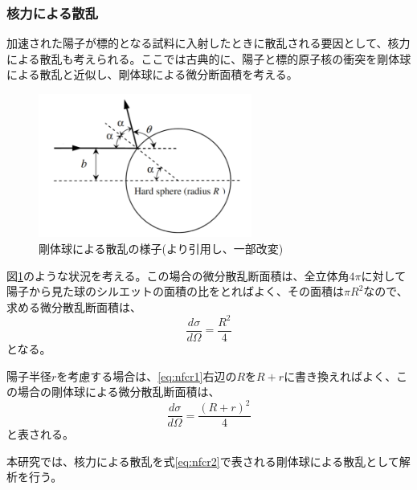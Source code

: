 \documentclass[a4paper,11pt,dvipdfmx]{jsarticle}
\begin{document}
\newpage
\subsubsection{核力による散乱}\label{NF}
加速された陽子が標的となる試料に入射したときに散乱される要因として、核力による散乱も考えられる。ここでは古典的に、陽子と標的原子核の衝突を剛体球による散乱と近似し、剛体球による微分断面積を考える。

\begin{figure}[htbp]
\centering
\includegraphics[width=7cm]{picture/cstheory/NF.png}
\caption{剛体球による散乱の様子(\cite{ion}より引用し、一部改変)}
\label{fig:NF}
\end{figure}

図\ref{fig:NF}のような状況を考える。この場合の微分散乱断面積は、全立体角$4\pi$に対して陽子から見た球のシルエットの面積の比をとればよく、その面積は$\pi R^{2}$なので、 \\
求める微分散乱断面積は、
\begin{equation}
    \frac{d\sigma}{d\Omega}=\frac{R^{2}}{4}
    \label{eq:nfcr1}
\end{equation}
となる。

陽子半径$r$を考慮する場合は、\eqref{eq:nfcr1}右辺の$R$を$R+r$に書き換えればよく\cite{ion}、この場合の剛体球による微分散乱断面積は、
\begin{equation}
    \frac{d\sigma}{d\Omega}=\frac{(R+r)^{2}}{4}
    \label{eq:nfcr2}
\end{equation}
と表される。

本研究では、核力による散乱を式\eqref{eq:nfcr2}で表される剛体球による散乱として解析を行う。
\end{document}
